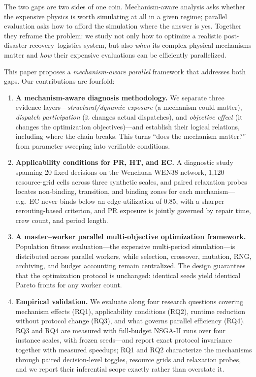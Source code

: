 \documentclass[10pt,conference,letterpaper]{IEEEtran}
\begin{document}
The two gaps are two sides of one coin. Mechanism-aware analysis asks
whether the expensive physics is worth simulating at all in a given
regime; parallel evaluation asks how to afford the simulation where the
answer is yes. Together they reframe the problem: we study not only how
to optimize a realistic post-disaster recovery--logistics system, but
also \emph{when} its complex physical mechanisms matter and \emph{how}
their expensive evaluations can be efficiently parallelized.

This paper proposes a \emph{mechanism-aware parallel} framework that
addresses both gaps. Our contributions are fourfold:

\begin{enumerate}
\item \textbf{A mechanism-aware diagnosis methodology.} We separate three
evidence layers---\emph{structural/dynamic exposure} (a mechanism could
matter), \emph{dispatch participation} (it changes actual dispatches), and
\emph{objective effect} (it changes the optimization objectives)---and
establish their logical relations, including where the chain breaks. This
turns ``does the mechanism matter?'' from parameter sweeping into
verifiable conditions.

\item \textbf{Applicability conditions for PR, HT, and EC.} A diagnostic
study spanning 20 fixed decisions on the Wenchuan WEN38 network, 1{,}120
resource-grid cells across three synthetic scales, and paired relaxation
probes locates non-binding, transition, and binding zones for each
mechanism---e.g.\ EC never binds below an edge-utilization of 0.85, with a
sharper rerouting-based criterion, and PR exposure is jointly governed by
repair time, crew count, and period length.

\item \textbf{A master--worker parallel multi-objective optimization
framework.} Population fitness evaluation---the expensive multi-period
simulation---is distributed across parallel workers, while selection,
crossover, mutation, RNG, archiving, and budget accounting remain
centralized. The design guarantees that the optimization protocol is
unchanged: identical seeds yield identical Pareto fronts for any worker
count.

\item \textbf{Empirical validation.} We evaluate along four research
questions covering mechanism effects (RQ1), applicability conditions
(RQ2), runtime reduction without protocol change (RQ3), and what governs
parallel efficiency (RQ4). RQ3 and RQ4 are measured with full-budget
NSGA-II runs over four instance scales, with frozen seeds---and report
exact protocol invariance together with measured speedups; RQ1 and RQ2
characterize the mechanisms through paired decision-level toggles,
resource grids and relaxation probes, and we report their inferential
scope exactly rather than overstate it.
\end{enumerate}
\end{document}
